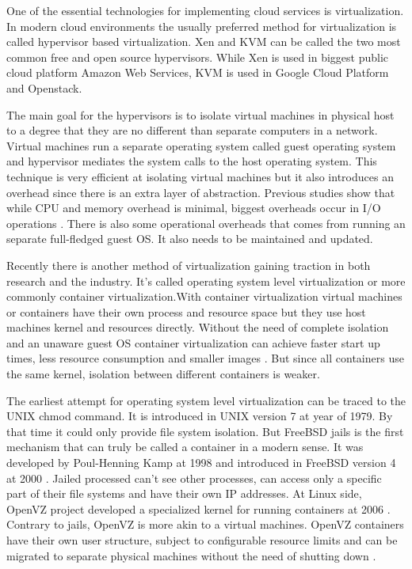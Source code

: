 \documentclass[12pt,oneandhalf,chaparabic,ceng,ms,eng,oneside,pntc]{gsufbe}
\begin{document}
One of the essential technologies for implementing cloud services is virtualization.  In modern cloud
environments the usually preferred method for virtualization is called hypervisor based virtualization.
Xen and KVM can be called the two most common free and open source hypervisors.  While Xen is used in
biggest public cloud platform Amazon Web Services, KVM is used in Google Cloud Platform and Openstack.

The main goal for the hypervisors is to isolate virtual machines in physical host to a degree that they
are no different than separate computers in a network.  Virtual machines run a separate operating system
called guest operating system and hypervisor mediates the system calls to the host operating system.
This technique is very efficient at isolating virtual machines but it also introduces an overhead
since there is an extra layer of abstraction.  Previous studies show that while CPU and memory overhead
is minimal, biggest overheads occur in I/O operations \cite{hwang_component_based_2013}.  There is also
some operational overheads that
comes from running an separate full-fledged guest OS.  It also needs to be maintained and updated.

Recently there is another method of virtualization gaining traction in both research and the industry.
It's called operating system level virtualization or more commonly container virtualization.With
container virtualization virtual machines or containers have their own process and resource space but
they use host machines kernel and resources directly.  Without the need of complete isolation and an
unaware guest OS container virtualization can achieve faster start up times, less resource consumption
and smaller images \cite{joy_performance_2015}.  But since all containers use the same kernel, isolation
between different containers is weaker.

The earliest attempt for operating system level virtualization can be traced to the UNIX chmod command.
It is introduced in UNIX version 7 at year of 1979.  By that time it could only provide file system
isolation.  But FreeBSD jails is the first mechanism that can truly be called a container in a modern
sense.  It was developed by Poul-Henning Kamp at 1998 and introduced in FreeBSD version 4 at 2000 
\cite{kamp_jails_2000}.
Jailed processed can't see other processes, can access only a specific part of their file systems and
have their own IP addresses.  At Linux side, OpenVZ project developed a specialized kernel for running
containers at 2006 \cite{kolyshkin_virtualization_2006}.  Contrary to jails, OpenVZ is more akin to a
virtual machines.  OpenVZ containers
have their own user structure, subject to configurable resource limits and can be migrated to separate
physical machines without the need of shutting down \cite{bernstein_containers_2014}.
\end{document}
